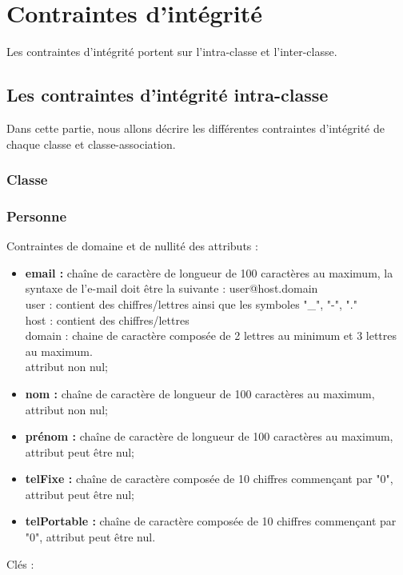\section{Contraintes d'intégrité}

Les contraintes d'intégrité portent sur l'intra-classe et l'inter-classe.

\subsection{Les contraintes d'intégrité intra-classe}
Dans cette partie, nous allons décrire les différentes contraintes d'intégrité de chaque classe et classe-association.

\subsubsection{Classe} 
 
\subsubsection*{Personne}
Contraintes de domaine et de nullité des attributs :
\begin{itemize}
	\item \textbf{email :} chaîne de caractère de longueur de 100 caractères au maximum, la syntaxe de l'e-mail doit être la suivante : user@host.domain\\
	user : contient des chiffres/lettres ainsi que les symboles "\_", "-", "." \\
	host : contient des chiffres/lettres \\
	domain : chaine de caractère composée de 2 lettres au minimum et 3 lettres au maximum. \\
	attribut non nul;  
 	\item \textbf{nom :} chaîne de caractère de longueur de 100 caractères au maximum, attribut non nul;
	\item \textbf{prénom :} chaîne de caractère de longueur de 100 caractères au maximum, attribut peut être nul;
	\item \textbf{telFixe :} chaîne de caractère composée de 10 chiffres commençant par "0", attribut peut être nul;
	\item \textbf{telPortable :} chaîne de caractère composée de 10 chiffres commençant par "0", attribut peut être nul.\\
\end{itemize}  

Clés : 

